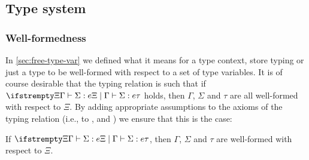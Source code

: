 \subsection{Type system}

\subsubsection{Well-formedness}

In \cref{sec:free-type-var} we defined what it means for a type context, store typing or just a type to be well-formed with respect to a set of type variables. It is of course desirable that the typing relation is such that if $\typerel{\Xi}{\Gamma}{\Sigma}{e}{\tau}$ holds, then $\Gamma$, $\Sigma$ and $\tau$ are all well-formed with respect to $\Xi$. By adding appropriate assumptions to the axioms of the typing relation (i.e., to ,  and ) we ensure that this is the case:

\begin{proposition}
    \label{prop:types-well-formed}
    If $\typerel{\Xi}{\Gamma}{\Sigma}{e}{\tau}$, then $\Gamma$, $\Sigma$ and $\tau$ are well-formed with respect to $\Xi$.
\end{proposition}

